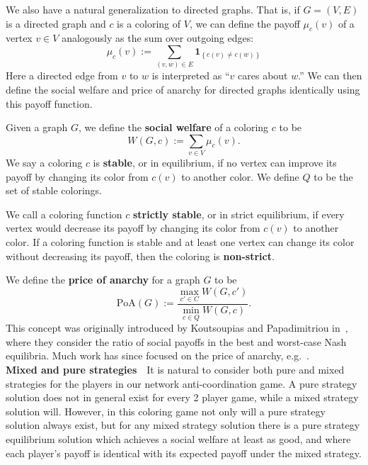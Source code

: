 \documentclass{llncs}
\newcommand{\ind}[1]{\textbf{1}_{\left \{ #1 \right \}}}
\begin{document}
We also have a natural generalization to directed graphs.  That is, if $G =
(V,E)$ is a directed graph and $c$ is a coloring of $V$, we can define the
payoff $\mu_c(v)$ of a vertex $v \in V$ analogously as the sum over outgoing
edges:
\[ 
	\mu_c(v) := \sum_{(v,w) \in E} \ind{c(v) \neq c(w)}
\]
Here a directed edge from $v$ to $w$ is interpreted as ``$v$ cares about $w$.''
We can then define the social welfare and price of anarchy for directed graphs
identically using this payoff function. 

Given a graph $G$, we define the \textbf{social welfare} of a coloring $c$ to
be
\[
   W(G,c) := \sum_{v \in V} \mu_c(v).
\]
We say a coloring $c$ is \textbf{stable}, or in {equilibrium}, if no vertex can
improve its payoff by changing its color from $c(v)$ to another color. We define
$Q$ to be the set of stable colorings.

We call a coloring function $c$ \textbf{strictly stable}, or in {strict
equilibrium}, if every vertex would decrease its payoff by changing its color
from $c(v)$ to another color. If a coloring function is stable and at least one
vertex can change its color without decreasing its payoff, then the coloring is
\textbf{non-strict}.


We define the \textbf{price of anarchy} for a graph $G$ to be
\[
\mbox{PoA}(G) := \frac{\max_{c' \in C}W(G,c')}
{\min_{c \in Q}W(G,c)}.
\]
This concept was originally introduced by Koutsoupias and Papadimitriou
in~\cite{KP99}, where they consider the ratio of social payoffs in the best and
worst-case Nash equilibria. Much work has since focused on the price of anarchy,
e.g.~\cite{FKKMS02,RT02}.\\

\noindent \textbf{Mixed and pure strategies}\ \
It is natural to consider both pure and mixed strategies for the players in our
network anti-coordination game.  A pure strategy solution does not in general
exist for every 2 player game, while a mixed strategy solution will.  However,
in this coloring game not only will a pure strategy solution always exist, but
for any mixed strategy solution there is a pure strategy equilibrium solution
which achieves a social welfare at least as good, and where each player's payoff
is identical with its expected payoff under the mixed strategy.\\
\end{document}
